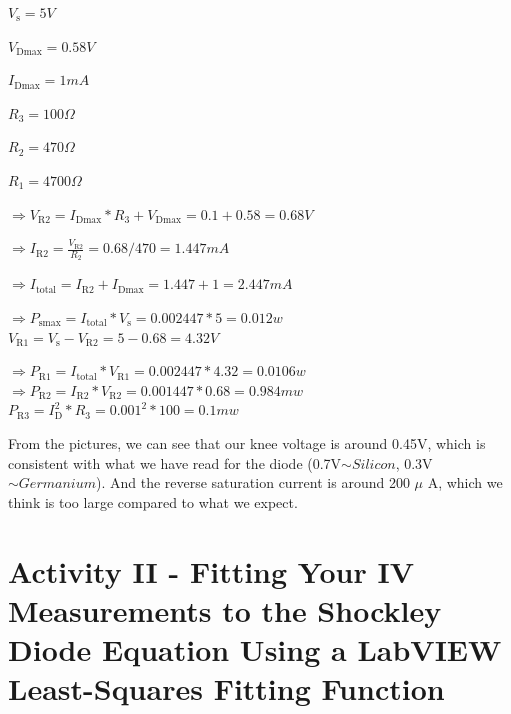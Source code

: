 \documentclass[11pt]{article}
\begin{document}
$V_{\mathrm {s} }=5 V$

$V_{\mathrm {Dmax} }=0.58 V$

$I_{\mathrm {Dmax} }=1 mA$

$R_{\mathrm {3} }=100 \Omega$

$R_{\mathrm {2} }=470 \Omega$

$R_{\mathrm {1} }=4700 \Omega$

$\Rightarrow V_{\mathrm {R2} }=I_{\mathrm {Dmax} }*R_{\mathrm {3} }+V_{\mathrm {Dmax} }=0.1+0.58=0.68 V$

$\Rightarrow I_{\mathrm {R2} }={\frac {V_{\mathrm {R2} }}{R_{\mathrm {2} }}}=0.68/470=1.447 mA $

$\Rightarrow I_{\mathrm {total} }=I_{\mathrm {R2} }+I_{\mathrm {Dmax} }=1.447+1=2.447 mA $

$\Rightarrow P_{\mathrm {smax} }=I_{\mathrm {total} }*V_{\mathrm {s} }=0.002447*5=0.012 w $ \\[1em]

$ V_{\mathrm {R1} }=V_{\mathrm {s} }-V_{\mathrm {R2} }=5-0.68=4.32 V $

$\Rightarrow P_{\mathrm {R1} }=I_{\mathrm {total} }*V_{\mathrm {R1} }=0.002447*4.32=0.0106 w $ \\[1em]

$\Rightarrow P_{\mathrm {R2} }=I_{\mathrm {R2} }*V_{\mathrm {R2} }=0.001447*0.68=0.984 mw $ \\[1em]

$P_{\mathrm {R3} }=I_{\mathrm {D} }^2*R_{\mathrm {3} }=0.001^2*100=0.1 mw $

From the pictures, we can see that our knee voltage is around 0.45V, which is consistent with what we have read for the diode (0.7V$\sim{Silicon}$, 0.3V$\sim{Germanium}$). And the reverse saturation current is around 200 $\mu$ A, which we think is too large compared to what we expect.



\section{Activity II - Fitting Your IV Measurements to the Shockley Diode Equation Using a LabVIEW Least-Squares Fitting Function}
\end{document}
